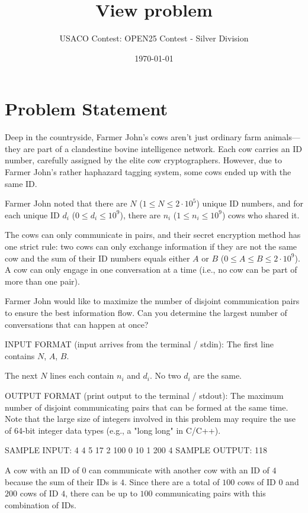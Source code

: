 \documentclass[12pt]{article}
\title{View problem}
\author{USACO Contest: OPEN25 Contest - Silver Division}
\date{\today}
\begin{document}
\maketitle

\section*{Problem Statement}


Deep in the countryside, Farmer John’s cows aren’t just ordinary farm
animals—they are part of a clandestine bovine intelligence network. Each cow
carries an ID number, carefully assigned by the elite cow cryptographers.
However, due to Farmer John's rather haphazard tagging system, some cows ended
up with the same ID.

Farmer John noted that there are $N$ ($1\le N\le 2\cdot 10^5$) unique ID
numbers, and for each unique ID $d_i$ ($0\le d_i\le 10^9$), there are $n_i$
($1\le n_i\le 10^9$) cows who shared it.

The cows can only communicate in pairs, and their secret encryption method has
one strict rule: two cows can only exchange information if they are not the same
cow and the sum of their ID numbers equals either $A$ or $B$
($0\le A\le B\le 2\cdot 10^9$). A cow can only engage in one conversation at a
time (i.e., no cow can be part of more than one pair).

Farmer John would like to maximize the number of disjoint communication pairs to
ensure the best information flow. Can you determine the largest number of
conversations that can happen at once?

INPUT FORMAT (input arrives from the terminal / stdin):
The first line contains $N$, $A$, $B$.

The next $N$ lines each contain $n_i$ and $d_i$. No two $d_i$ are the same. 

OUTPUT FORMAT (print output to the terminal / stdout):
The maximum number of disjoint communicating pairs that can be formed at the
same time.
    Note that the large size of integers involved in this problem may require the
use of 64-bit integer data types (e.g., a "long long" in C/C++).

SAMPLE INPUT:
4 4 5
17 2
100 0
10 1
200 4
SAMPLE OUTPUT: 
118

A cow with an ID of $0$ can communicate with another cow with an ID of $4$
because the sum of their IDs is $4$.  Since there are a total of $100$ cows of
ID $0$ and $200$ cows of ID $4$,  there can be up to $100$ communicating pairs
with this combination of IDs.
\end{document}

